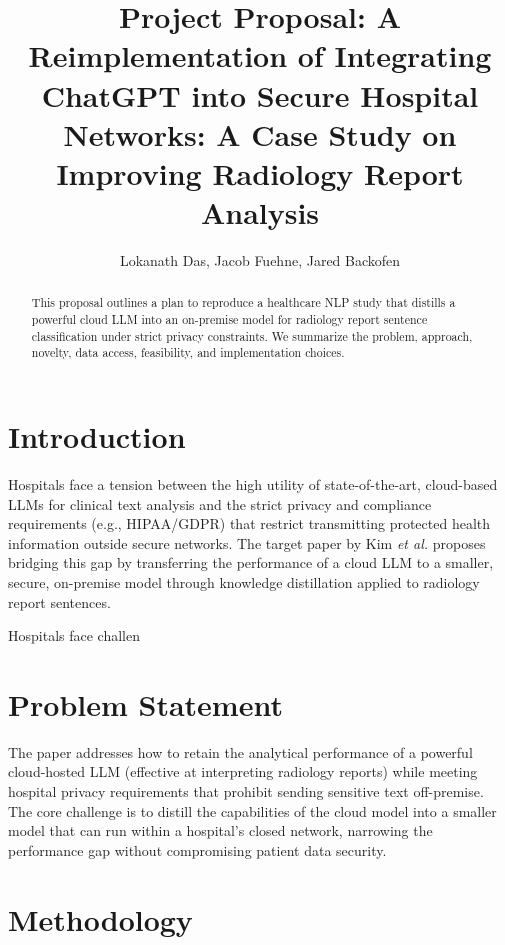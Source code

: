 \documentclass[letterpaper]{article} %
\title{Project Proposal: A Reimplementation of Integrating ChatGPT into Secure Hospital Networks: A Case Study on Improving Radiology Report Analysis }
\author{
  Lokanath Das, Jacob Fuehne, Jared Backofen
}
\begin{document}
\maketitle

\begin{abstract}
This proposal outlines a plan to reproduce a healthcare NLP study that distills a powerful cloud LLM into an on-premise model for radiology report sentence classification under strict privacy constraints. We summarize the problem, approach, novelty, data access, feasibility, and implementation choices.
\end{abstract}

\section{Introduction}
Hospitals face a tension between the high utility of state-of-the-art, cloud-based LLMs for clinical text analysis and the strict privacy and compliance requirements (e.g., HIPAA/GDPR) that restrict transmitting protected health information outside secure networks. The target paper by Kim \emph{et al.} \cite{kim2024chatgpt} proposes bridging this gap by transferring the performance of a cloud LLM to a smaller, secure, on-premise model through knowledge distillation applied to radiology report sentences.

Hospitals face challen


\section{Problem Statement}
The paper addresses how to retain the analytical performance of a powerful cloud-hosted LLM (effective at interpreting radiology reports) while meeting hospital privacy requirements that prohibit sending sensitive text off-premise. The core challenge is to distill the capabilities of the cloud model into a smaller model that can run within a hospital’s closed network, narrowing the performance gap without compromising patient data security.

\section{Methodology}
\end{document}
